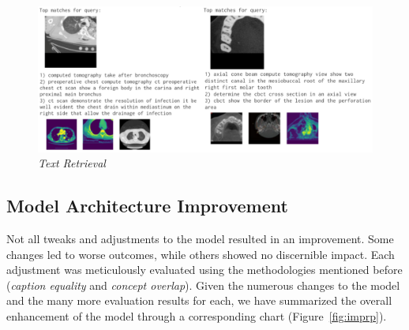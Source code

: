 \documentclass[10pt,twocolumn,letterpaper]{article}
\begin{document}
\begin{figure}
   \centering
   \includegraphics[width=1\linewidth]{img/I2T_test_compact.png}
   \caption{\textit{Text Retrieval}}
   \label{fig:tret}
\end{figure}


\subsection{Model Architecture Improvement}


Not all tweaks and adjustments to the model resulted in an improvement. Some changes led to worse outcomes, while others showed no discernible impact. Each adjustment was meticulously evaluated using the methodologies mentioned before (\textit{caption equality} and \textit{concept overlap}). Given the numerous changes to the model and the many more evaluation results for each, we have summarized the overall enhancement of the model through a corresponding chart (Figure\ \ref{fig:imprp}).
\end{document}
